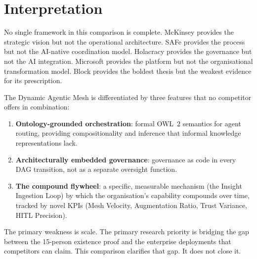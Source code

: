 \section{Interpretation}

No single framework in this comparison is complete. McKinsey provides the strategic vision but not the operational architecture. SAFe provides the process but not the AI-native coordination model. Holacracy provides the governance but not the AI integration. Microsoft provides the platform but not the organisational transformation model. Block provides the boldest thesis but the weakest evidence for its prescription.

The Dynamic Agentic Mesh is differentiated by three features that no competitor offers in combination:

\begin{enumerate}
  \item \textbf{Ontology-grounded orchestration}: formal OWL~2 semantics for agent routing, providing compositionality and inference that informal knowledge representations lack.
  \item \textbf{Architecturally embedded governance}: governance as code in every DAG transition, not as a separate oversight function.
  \item \textbf{The compound flywheel}: a specific, measurable mechanism (the Insight Ingestion Loop) by which the organisation's capability compounds over time, tracked by novel KPIs (Mesh Velocity, Augmentation Ratio, Trust Variance, HITL Precision).
\end{enumerate}

The primary weakness is scale. The primary research priority is bridging the gap between the 15-person existence proof and the enterprise deployments that competitors can claim. This comparison clarifies that gap. It does not close it.
